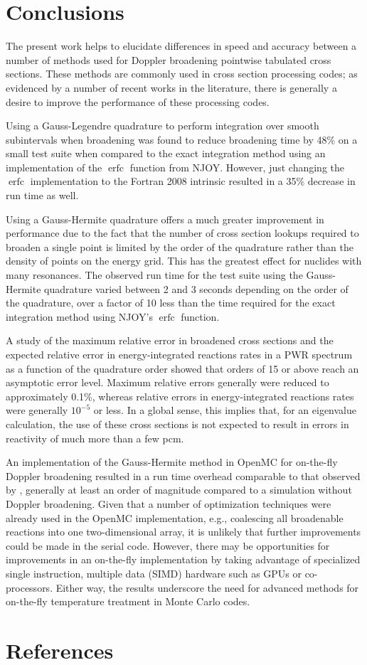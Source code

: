 \documentclass[3p,authoryear]{elsarticle}
\DeclareMathOperator\erfc{erfc}
\begin{document}
\section{Conclusions}

The present work helps to elucidate differences in speed and accuracy between a
number of methods used for Doppler broadening pointwise tabulated cross
sections. These methods are commonly used in cross section processing codes; as
evidenced by a number of recent works in the literature, there is generally a
desire to improve the performance of these processing codes.

Using a Gauss-Legendre quadrature to perform integration over smooth
subintervals when broadening was found to reduce broadening time by 48\% on a
small test suite when compared to the exact integration method using an
implementation of the $\erfc$ function from NJOY. However, just changing the
$\erfc$ implementation to the Fortran 2008 intrinsic resulted in a 35\% decrease
in run time as well.

Using a Gauss-Hermite quadrature offers a much greater improvement in
performance due to the fact that the number of cross section lookups required to
broaden a single point is limited by the order of the quadrature rather than the
density of points on the energy grid. This has the greatest effect for nuclides
with many resonances. The observed run time for the test suite using the
Gauss-Hermite quadrature varied between 2 and 3 seconds depending on the order
of the quadrature, over a factor of 10 less than the time required for the exact
integration method using NJOY's $\erfc$ function.

A study of the maximum relative error in broadened cross sections and the
expected relative error in energy-integrated reactions rates in a PWR spectrum
as a function of the quadrature order showed that orders of 15 or above reach an
asymptotic error level. Maximum relative errors generally were reduced to
approximately 0.1\%, whereas relative errors in energy-integrated reactions
rates were generally $10^{-5}$ or less. In a global sense, this implies that,
for an eigenvalue calculation, the use of these cross sections is not expected
to result in errors in reactivity of much more than a few pcm.

An implementation of the Gauss-Hermite method in OpenMC for on-the-fly Doppler
broadening resulted in a run time overhead comparable to that observed by
\citet{nd-dean-2010}, generally at least an order of magnitude compared to a
simulation without Doppler broadening. Given that a number of optimization
techniques were already used in the OpenMC implementation, e.g., coalescing all
broadenable reactions into one two-dimensional array, it is unlikely that
further improvements could be made in the serial code. However, there may be
opportunities for improvements in an on-the-fly implementation by taking
advantage of specialized single instruction, multiple data (SIMD) hardware such
as GPUs or co-processors. Either way, the results underscore the need for
advanced methods for on-the-fly temperature treatment in Monte Carlo codes.

\section*{References}



\end{document}
